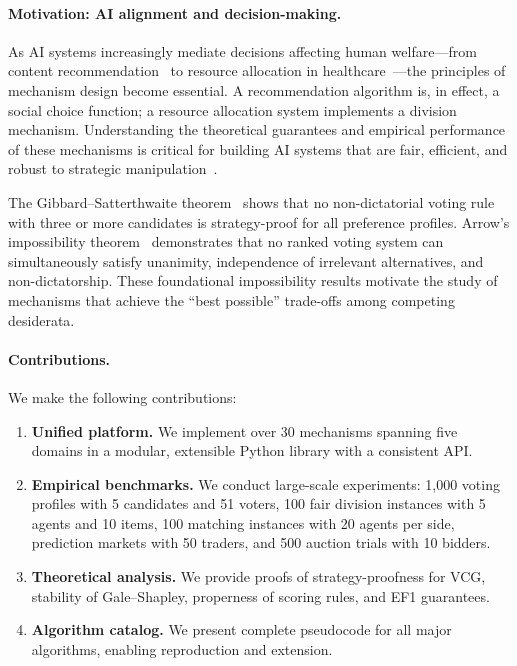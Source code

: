 \documentclass[10pt]{article}
\begin{document}
\paragraph{Motivation: AI alignment and decision-making.}
As AI systems increasingly mediate decisions affecting human welfare---from content recommendation~\citep{milano2020recommender} to resource allocation in healthcare~\citep{bertsimas2013fairness}---the principles of mechanism design become essential. A recommendation algorithm is, in effect, a social choice function; a resource allocation system implements a division mechanism. Understanding the theoretical guarantees and empirical performance of these mechanisms is critical for building AI systems that are fair, efficient, and robust to strategic manipulation~\citep{conitzer2024social}.

The Gibbard--Satterthwaite theorem~\citep{gibbard1973manipulation, satterthwaite1975strategy} shows that no non-dictatorial voting rule with three or more candidates is strategy-proof for all preference profiles. Arrow's impossibility theorem~\citep{arrow1951social} demonstrates that no ranked voting system can simultaneously satisfy unanimity, independence of irrelevant alternatives, and non-dictatorship. These foundational impossibility results motivate the study of mechanisms that achieve the ``best possible'' trade-offs among competing desiderata.

\paragraph{Contributions.}
We make the following contributions:
\begin{enumerate}[leftmargin=*,itemsep=2pt]
  \item \textbf{Unified platform.} We implement over 30 mechanisms spanning five domains in a modular, extensible Python library with a consistent API.
  \item \textbf{Empirical benchmarks.} We conduct large-scale experiments: 1{,}000 voting profiles with 5 candidates and 51 voters, 100 fair division instances with 5 agents and 10 items, 100 matching instances with 20 agents per side, prediction markets with 50 traders, and 500 auction trials with 10 bidders.
  \item \textbf{Theoretical analysis.} We provide proofs of strategy-proofness for VCG, stability of Gale--Shapley, properness of scoring rules, and EF1 guarantees.
  \item \textbf{Algorithm catalog.} We present complete pseudocode for all major algorithms, enabling reproduction and extension.
\end{enumerate}
\end{document}
